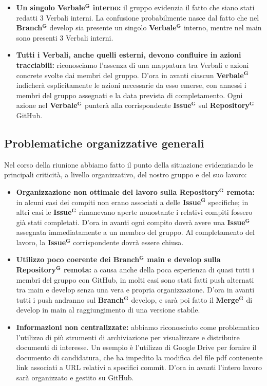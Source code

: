 \documentclass[a4paper,12pt]{article}
\newcommand{\term}[1]{\textbf{#1}$^\mathbf{G}$}
\begin{document}
\begin{itemize}
    \item \textbf{Un singolo \term{Verbale} interno:} il gruppo evidenzia il fatto che siano stati redatti 3 Verbali interni. La confusione probabilmente nasce dal fatto che nel \term{Branch} develop sia presente un singolo \term{Verbale} interno, mentre nel main sono presenti 3 Verbali interni. 
    \item \textbf{Tutti i Verbali, anche quelli esterni, devono confluire in azioni tracciabili:} riconosciamo l'assenza di una mappatura tra Verbali e azioni concrete svolte dai membri del gruppo. D'ora in avanti ciascun \term{Verbale} indicherà esplicitamente le azioni necessarie da esso emerse, con annessi i membri del gruppo assegnati e la data prevista di completamento. Ogni azione nel \term{Verbale} punterà alla corrispondente \term{Issue} sul \term{Repository} GitHub.
\end{itemize}

\subsection{Problematiche organizzative generali}
Nel corso della riunione abbiamo fatto il punto della situazione evidenziando le principali criticità, a livello organizzativo, del nostro gruppo e del suo lavoro:

\begin{itemize}
    \item \textbf{Organizzazione non ottimale del lavoro sulla \term{Repository} remota:} in alcuni casi dei compiti non erano associati a delle \term{Issue} specifiche; in altri casi le \term{Issue} rimanevano aperte nonostante i relativi compiti fossero già stati completati. D'ora in avanti ogni compito dovrà avere una \term{Issue} assegnata immediatamente a un membro del gruppo. Al completamento del lavoro, la \term{Issue} corrispondente dovrà essere chiusa.
    \item \textbf{Utilizzo poco coerente dei \term{Branch} main e develop sulla \term{Repository} remota:} a causa anche della poca esperienza di quasi tutti i membri del gruppo con GitHub, in molti casi sono stati fatti push alternati tra main e develop senza una vera e propria organizzazione. D'ora in avanti tutti i push andranno sul \term{Branch} develop, e sarà poi fatto il \term{Merge} di develop in main al raggiungimento di una versione stabile.
    \item \textbf{Informazioni non centralizzate:} abbiamo riconosciuto come problematico l'utilizzo di più strumenti di archiviazione per visualizzare e distribuire documenti di interesse. Un esempio è l'utilizzo di Google Drive per fornire il documento di candidatura, che ha impedito la modifica del file pdf contenente link associati a URL relativi a specifici commit. D'ora in avanti l'intero lavoro sarà organizzato e gestito su GitHub.
\end{itemize}
\end{document}
